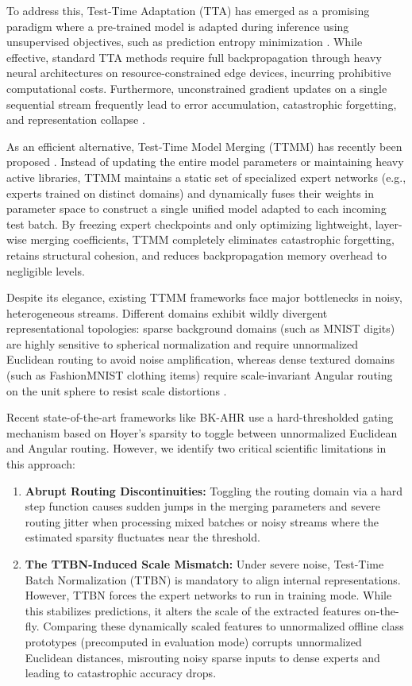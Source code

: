 \documentclass{article}
\theoremstyle{plain}
\theoremstyle{definition}
\theoremstyle{remark}
\begin{document}
To address this, Test-Time Adaptation (TTA) has emerged as a promising paradigm where a pre-trained model is adapted during inference using unsupervised objectives, such as prediction entropy minimization \cite{wang2021tent}. While effective, standard TTA methods require full backpropagation through heavy neural architectures on resource-constrained edge devices, incurring prohibitive computational costs. Furthermore, unconstrained gradient updates on a single sequential stream frequently lead to error accumulation, catastrophic forgetting, and representation collapse \cite{wang2022continual, niu2022efficient}.

As an efficient alternative, Test-Time Model Merging (TTMM) has recently been proposed \cite{bertolissi2025local, razaimam2025t3}. Instead of updating the entire model parameters or maintaining heavy active libraries, TTMM maintains a static set of specialized expert networks (e.g., experts trained on distinct domains) and dynamically fuses their weights in parameter space to construct a single unified model adapted to each incoming test batch. By freezing expert checkpoints and only optimizing lightweight, layer-wise merging coefficients, TTMM completely eliminates catastrophic forgetting, retains structural cohesion, and reduces backpropagation memory overhead to negligible levels.

Despite its elegance, existing TTMM frameworks face major bottlenecks in noisy, heterogeneous streams. Different domains exhibit wildly divergent representational topologies: sparse background domains (such as MNIST digits) are highly sensitive to spherical normalization and require unnormalized Euclidean routing to avoid noise amplification, whereas dense textured domains (such as FashionMNIST clothing items) require scale-invariant Angular routing on the unit sphere to resist scale distortions \cite{hoyer2004non, razaimam2025t3}.

Recent state-of-the-art frameworks like BK-AHR \cite{anonymous} use a hard-thresholded gating mechanism based on Hoyer's sparsity to toggle between unnormalized Euclidean and Angular routing. However, we identify two critical scientific limitations in this approach:
\begin{enumerate}
    \item \textbf{Abrupt Routing Discontinuities:} Toggling the routing domain via a hard step function causes sudden jumps in the merging parameters and severe routing jitter when processing mixed batches or noisy streams where the estimated sparsity fluctuates near the threshold.
    \item \textbf{The TTBN-Induced Scale Mismatch:} Under severe noise, Test-Time Batch Normalization (TTBN) is mandatory to align internal representations. However, TTBN forces the expert networks to run in training mode. While this stabilizes predictions, it alters the scale of the extracted features on-the-fly. Comparing these dynamically scaled features to unnormalized offline class prototypes (precomputed in evaluation mode) corrupts unnormalized Euclidean distances, misrouting noisy sparse inputs to dense experts and leading to catastrophic accuracy drops.
\end{enumerate}
\end{document}
